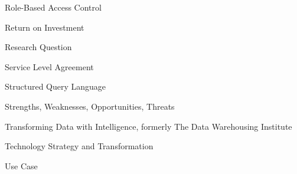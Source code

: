 \begin{description}[leftmargin=3.2cm, style=sameline, itemsep=2pt, font=\normalfont\bfseries]
\item[RBAC] Role-Based Access Control
\item[ROI] Return on Investment
\item[RQ] Research Question
\item[SLA] Service Level Agreement
\item[SQL] Structured Query Language
\item[SWOT] Strengths, Weaknesses, Opportunities, Threats
\item[TDWI] Transforming Data with Intelligence, formerly The Data Warehousing Institute
\item[TST] Technology Strategy and Transformation
\item[UC] Use Case
\end{description}
